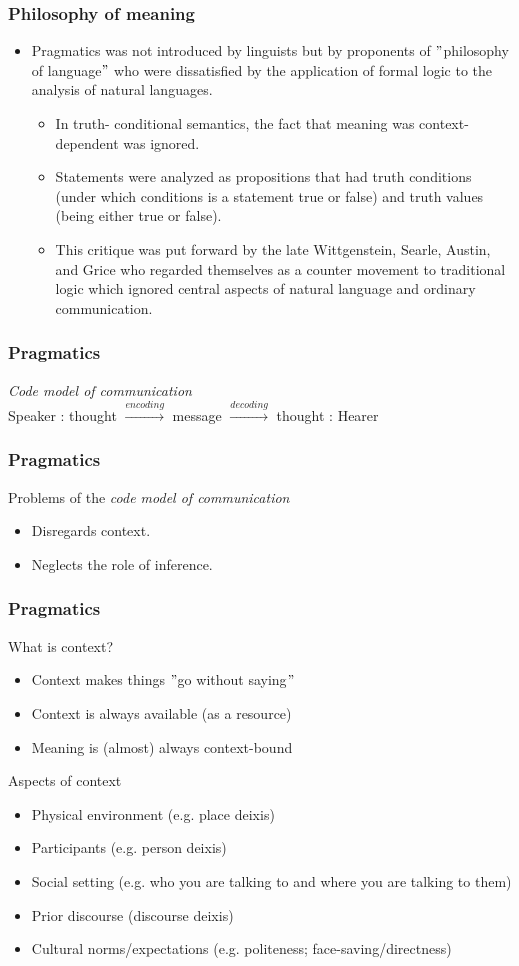 \documentclass[12pt, table]{beamer}
\begin{document}
\begin{frame}
\frametitle{Philosophy of meaning}
\begin{itemize}
\item Pragmatics was not introduced by linguists but by proponents of $"$philosophy of language$"$ who were dissatisfied by the application of formal logic to the analysis of natural languages.
\begin{itemize}
\item In truth- conditional semantics, the fact that meaning was context-dependent was ignored. 
\item Statements were analyzed as propositions that had truth conditions (under which conditions is a statement true or false) and truth values (being either true or false).
\item This critique was put forward by the late Wittgenstein, Searle, Austin, and Grice who regarded themselves as a counter movement to traditional logic which ignored central aspects of natural language and ordinary communication.
\end{itemize}
\end{itemize}
\end{frame}

\begin{frame}
\frametitle{Pragmatics}
\textit{Code model of communication}\\[.5cm]
Speaker : thought $\xrightarrow{encoding}$ message $\xrightarrow{decoding}$ thought : Hearer
\end{frame}

\begin{frame}
\frametitle{Pragmatics}
Problems of the \textit{code model of communication}\\[.5cm]
\begin{itemize}
\item Disregards context.
\item Neglects the role of inference.
\end{itemize}
\end{frame}

\begin{frame}
\frametitle{Pragmatics}
What is context?
\begin{itemize}
\item Context makes things $"$go without saying$"$
\item Context is always available (as a resource)
\item Meaning is (almost) always context-bound
\end{itemize}
Aspects of context
\begin{itemize}
\item Physical environment (e.g. place deixis)
\item Participants (e.g. person deixis)
\item Social setting (e.g. who you are talking to and where you are talking to them)
\item Prior discourse (discourse deixis)
\item Cultural norms/expectations (e.g. politeness; face-saving/directness)
\end{itemize}
\end{frame}
\end{document}
